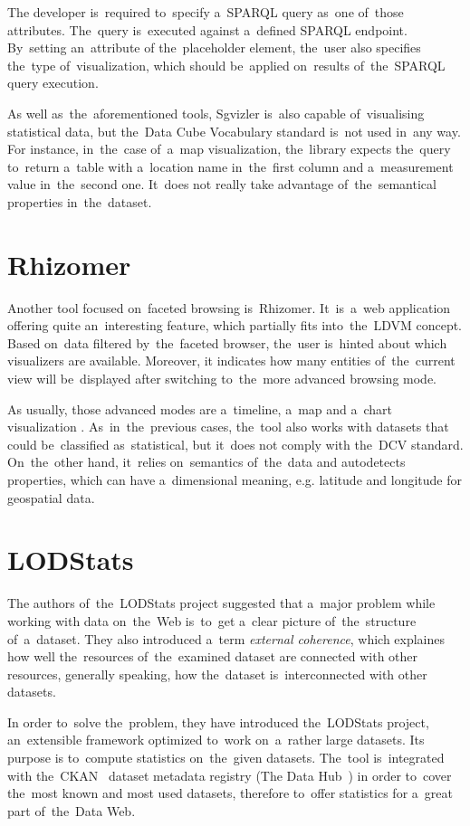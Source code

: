 The developer is~required to~specify a~SPARQL query as~one of~those attributes. The~query is~executed against a~defined SPARQL endpoint. By~setting an~attribute of
the~placeholder element, the~user also specifies the~type of~visualization, which 
should be~applied on~results of~the~SPARQL query execution.

As well as~the~aforementioned tools, Sgvizler is~also capable of~visualising statistical data, 
but the~Data Cube Vocabulary standard is~not used in~any way. For instance, in~the~case of~a~map visualization, the~library expects the~query to~return a~table 
with a~location name in~the~first column and a~measurement value in~the~second 
one. It~does not really take advantage of~the~semantical properties in~the~dataset.

\section{Rhizomer}
Another tool focused on~faceted browsing is~Rhizomer. It~is~a~web application 
offering quite an~interesting feature, which partially fits into~the~LDVM 
concept. Based on~data filtered by~the~faceted browser, the~user is~hinted about
which visualizers are available. Moreover, 
it indicates how many entities of~the~current view will be~displayed after 
switching to~the~more advanced browsing mode.

As usually, those advanced modes are a~timeline, a~map and a~chart visualization . As~in~the~previous cases, the~tool also works with datasets that could be~classified as~statistical, but it~does not comply with the~DCV standard. On~the~other hand, it~relies on~semantics of~the~data and autodetects properties, 
which can have a~dimensional meaning, e.g. latitude and longitude for geospatial data.

\section{LODStats}
The authors of~the~LODStats project suggested that a~major 
problem while working with data on~the~Web is~to~get a~clear picture of~the~structure of~a~dataset. They also introduced a~term \emph{external coherence},
which explaines how well the~resources of~the~examined dataset are connected with 
other resources, generally speaking, how the~dataset is~interconnected with 
other datasets.

In order to~solve the~problem, they have introduced the~LODStats project, an~extensible framework optimized to~work on~a~rather large datasets. Its purpose 
is to~compute statistics on~the~given datasets. The~tool is~integrated with the~CKAN~\cite{ckan} dataset metadata registry (The Data Hub~\cite{thedatahub})
in order to~cover the~most known and 
most used datasets, therefore to~offer statistics for a~great part of~the~Data 
Web.

